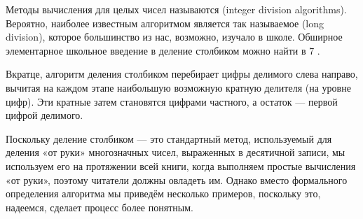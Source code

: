 Методы вычисления  для целых чисел называются  (integer division algorithms). Вероятно, наиболее известным алгоритмом является так называемое  (long division), которое большинство из нас, возможно, изучало в школе. Обширное элементарное школьное введение в деление столбиком можно найти в \chaptname{} 7 \cite{wu-1}.

Вкратце, алгоритм деления столбиком перебирает цифры делимого слева направо, вычитая на каждом этапе наибольшую возможную кратную делителя (на уровне цифр). Эти кратные затем становятся цифрами частного, а остаток — первой цифрой делимого.

Поскольку деление столбиком — это стандартный метод, используемый для деления «от руки» многозначных чисел, выраженных в десятичной записи, мы используем его на протяжении всей книги, когда выполняем простые вычисления «от руки», поэтому читатели должны овладеть им. Однако вместо формального определения алгоритма мы приведём несколько примеров, поскольку это, надеемся, сделает процесс более понятным.

